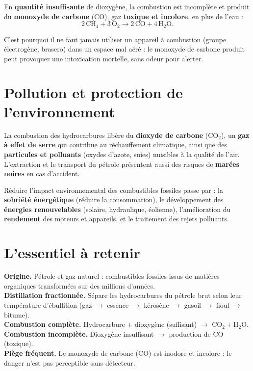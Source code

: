 \begin{propriete}
En \textbf{quantité insuffisante} de dioxygène, la combustion est incomplète et produit
du \textbf{monoxyde de carbone} (CO), gaz \textbf{toxique et incolore}, en plus de l'eau :
\[
\mathrm{2\,CH_4 + 3\,O_2 \longrightarrow 2\,CO + 4\,H_2O}.
\]
\end{propriete}

\begin{remarque}
C'est pourquoi il ne faut jamais utiliser un appareil à combustion (groupe électrogène,
brasero) dans un espace mal aéré : le monoxyde de carbone produit peut provoquer une
intoxication mortelle, sans odeur pour alerter.
\end{remarque}

\section{Pollution et protection de l'environnement}

\begin{propriete}
La combustion des hydrocarbures libère du \textbf{dioxyde de carbone} ($\mathrm{CO_2}$),
un \textbf{gaz à effet de serre} qui contribue au réchauffement climatique, ainsi que des
\textbf{particules et polluants} (oxydes d'azote, suies) nuisibles à la qualité de l'air.
L'extraction et le transport du pétrole présentent aussi des risques de \textbf{marées
noires} en cas d'accident.
\end{propriete}

\begin{propriete}
Réduire l'impact environnemental des combustibles fossiles passe par : la \textbf{sobriété
énergétique} (réduire la consommation), le développement des \textbf{énergies
renouvelables} (solaire, hydraulique, éolienne), l'amélioration du \textbf{rendement} des
moteurs et appareils, et le traitement des rejets polluants.
\end{propriete}

\section{L'essentiel à retenir}

\begin{synthese}
\textbf{Origine.} Pétrole et gaz naturel : combustibles fossiles issus de matières
organiques transformées sur des millions d'années.\\[4pt]
\textbf{Distillation fractionnée.} Sépare les hydrocarbures du pétrole brut selon leur
température d'ébullition (gaz $\to$ essence $\to$ kérosène $\to$ gasoil $\to$ fioul
$\to$ bitume).\\[4pt]
\textbf{Combustion complète.} Hydrocarbure $+$ dioxygène (suffisant) $\to$
$\mathrm{CO_2}+\mathrm{H_2O}$.\\[4pt]
\textbf{Combustion incomplète.} Dioxygène insuffisant $\to$ production de CO (toxique).\\[4pt]
\textbf{Piège fréquent.} Le monoxyde de carbone (CO) est inodore et incolore : le danger
n'est pas perceptible sans détecteur.
\end{synthese}

